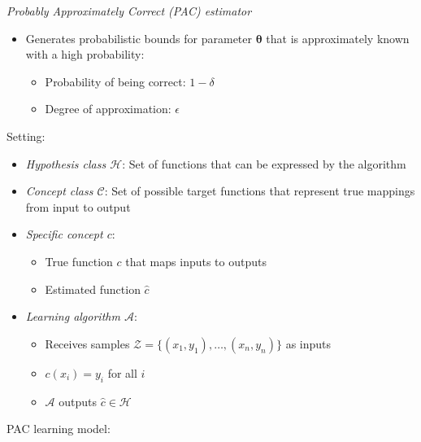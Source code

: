 \emph{Probably Approximately Correct (PAC) estimator}
\begin{itemize}
    \item Generates probabilistic bounds for parameter $\boldsymbol{\theta}$ that is approximately known with a high probability:
    \begin{itemize}
        \item Probability of being correct: $1-\delta$
        \item Degree of approximation: $\epsilon$
    \end{itemize}
\end{itemize}
Setting:
\begin{itemize}
    \item \emph{Hypothesis class $\mathcal{H}$}: Set of functions that can be expressed by the algorithm
    \item \emph{Concept class $\mathcal{C}$}: Set of possible target functions that represent true mappings from input to output
    \item \emph{Specific concept $c$}:
    \begin{itemize}
        \item True function $c$ that maps inputs to outputs
        \item Estimated function $\hat{c}$
    \end{itemize}
    \item \emph{Learning algorithm $\mathcal{A}$}:
    \begin{itemize}
        \item Receives samples $\mathcal{Z} = \{(x_1, y_1), \ldots, (x_n, y_n)\}$ as inputs
        \item $c(x_i) = y_i$ for all $i$
        \item $\mathcal{A}$ outputs $\hat{c} \in \mathcal{H}$
    \end{itemize}
\end{itemize}
PAC learning model:
